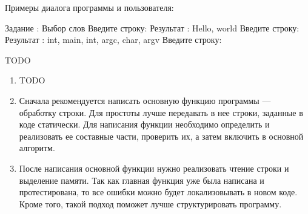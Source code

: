 Примеры диалога программы и пользователя:

\begin{zzoutput}
  Задание : Выбор слов
  Введите строку: 
  Результат     : Hello, world
  Введите строку: 
  Результат     : int, main, int, argc, char, argv
  Введите строку: \zzuser{ }
\end{zzoutput}


\zzsectionCOMMENTS

TODO

%


\zzsectionPLAN


\begin{enumerate}
\item TODO
\item Сначала рекомендуется написать основную функцию программы --- обработку строки. Для простоты лучше передавать в нее строки, заданные в коде статически. Для написания функции необходимо определить и реализовать ее составные части, проверить их, а затем включить в основной алгоритм.
\item После написания основной функции нужно реализовать чтение строки и выделение памяти. Так как главная функция уже была написана и протестирована, то все ошибки можно будет локализовывать в новом коде. Кроме того, такой подход поможет лучше структурировать программу.
\end{enumerate}


